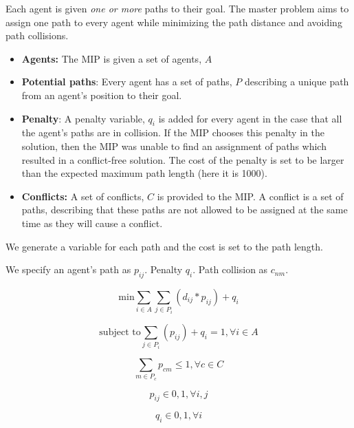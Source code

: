 \documentclass[a4paper,11pt]{article}
\begin{document}
Each agent is given \textit{one or more} paths to their goal. The master problem aims to assign one path to every agent while minimizing the path distance and avoiding path collisions. 

\begin{itemize}
	\item \textbf{Agents:} The MIP is given a set of agents, $A$
	\item \textbf{Potential paths}: Every agent has a set of paths, $P$ describing a unique path from an agent's position to their goal.
	\item \textbf{Penalty}: A penalty variable, $q_i$ is added for every agent in the case that all the agent's paths are in collision. If the MIP chooses this penalty in the solution, then the MIP was unable to find an assignment of paths which resulted in a conflict-free solution. The cost of the penalty is set to be larger than the expected maximum path length (here it is 1000).
	\item \textbf{Conflicts:} A set of conflicts, $C$ is provided to the MIP. A conflict is a set of paths, describing that these paths are not allowed to be assigned at the same time as they will cause a conflict. 
\end{itemize}

We generate a variable for each path and the cost is set to the path length.

We specify an agent's path as $p_{ij}$. Penalty $q_i$. Path collision as $c_{nm}$.



\begin{equation} \label{mas:min}
\text{min} \sum_{i \in A} \sum_{j \in P_i} (d_{ij} * p_{ij}) + q_i
\end{equation}

\begin{equation} \label{mas:pick} %
\text{subject to} \sum_{j \in P_i} (p_{ij}) + q_i = 1, \forall i \in A
\end{equation}

\begin{equation} \label{mas:conflict} %
\sum_{m \in P_c} p_{cm} \le 1, \forall c \in C
\end{equation}

\begin{equation} \label{mas:path-one-or-zero} %
p_{ij} \in {0, 1}, \forall i, j
\end{equation}

\begin{equation} \label{mas:penalty} %
q_{i} \in {0, 1}, \forall i
\end{equation}
\end{document}
